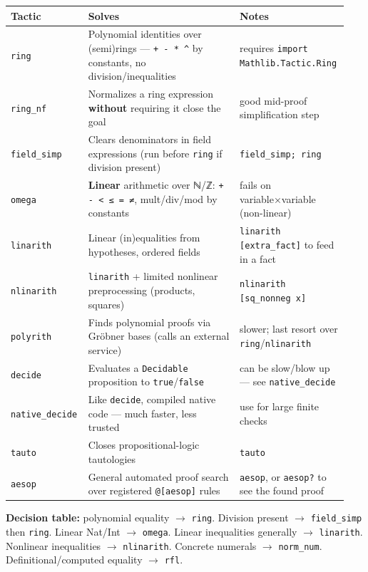 \begin{center}
\begin{tabular}{@{}p{0.20\linewidth}p{0.44\linewidth}p{0.30\linewidth}@{}}
\hline
\textbf{Tactic} & \textbf{Solves} & \textbf{Notes} \\
\hline
\texttt{ring} & Polynomial identities over (semi)rings --- \texttt{+ - * \textasciicircum{}} by constants, no division/inequalities & requires \texttt{import Mathlib.Tactic.Ring} \\
\texttt{ring\_nf} & Normalizes a ring expression \textbf{without} requiring it close the goal & good mid-proof simplification step \\
\texttt{field\_simp} & Clears denominators in field expressions (run before \texttt{ring} if division present) & \texttt{field\_simp; ring} \\
\texttt{omega} & \textbf{Linear} arithmetic over ℕ/ℤ: \texttt{+ - < ≤ = ≠}, mult/div/mod by constants & fails on variable×variable (non-linear) \\
\texttt{linarith} & Linear (in)equalities from hypotheses, ordered fields & \texttt{linarith [extra\_fact]} to feed in a fact \\
\texttt{nlinarith} & \texttt{linarith} + limited nonlinear preprocessing (products, squares) & \texttt{nlinarith [sq\_nonneg x]} \\
\texttt{polyrith} & Finds polynomial proofs via Gröbner bases (calls an external service) & slower; last resort over \texttt{ring}/\texttt{nlinarith} \\
\texttt{decide} & Evaluates a \texttt{Decidable} proposition to \texttt{true}/\texttt{false} & can be slow/blow up --- see \texttt{native\_decide} \\
\texttt{native\_decide} & Like \texttt{decide}, compiled native code --- much faster, less trusted & use for large finite checks \\
\texttt{tauto} & Closes propositional-logic tautologies & \texttt{tauto} \\
\texttt{aesop} & General automated proof search over registered \texttt{@[aesop]} rules & \texttt{aesop}, or \texttt{aesop?} to see the found proof \\
\hline
\end{tabular}
\end{center}

\textbf{Decision table:} polynomial equality $\rightarrow$ \texttt{ring}. Division present $\rightarrow$ \texttt{field\_simp} then \texttt{ring}. Linear Nat/Int $\rightarrow$ \texttt{omega}. Linear inequalities generally $\rightarrow$ \texttt{linarith}. Nonlinear inequalities $\rightarrow$ \texttt{nlinarith}. Concrete numerals $\rightarrow$ \texttt{norm\_num}. Definitional/computed equality $\rightarrow$ \texttt{rfl}.

